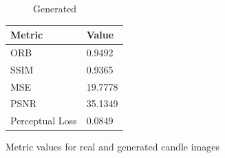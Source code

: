 \documentclass[12pt,DIV14,BCOR12mm,a4paper,footinclude=false,headinclude,parskip=half-,twoside,openright,cleardoublepage=empty,toc=index,bibliography=totoc,listof=totoc]{scrreprt}
\numberwithin{equation}{chapter}
\begin{document}
\begin{figure}
\begin{minipage}[H]{\linewidth}
\begin{minipage}[H]{0.5\linewidth}
\begin{subfigure}[t]{0.48\linewidth}
                \caption{Generated}
            \end{subfigure}
        \end{minipage}%
        \hfill
        \begin{minipage}[H]{0.5\linewidth} %
            \centering
            \small
            \begin{tabular}{p{3cm} p{2cm}}
                \toprule
                \textbf{Metric} & \textbf{Value} \\
                \midrule
                ORB             & 0.9492        \\
                SSIM            & 0.9365        \\
                MSE             & 19.7778       \\
                PSNR            & 35.1349       \\
                Perceptual Loss & 0.0849        \\
                \bottomrule
            \end{tabular}
        \end{minipage}%
        \caption{Metric values for real and generated candle images}
        \label{fig:comparison_real_generated_1_1_candle}
    \end{minipage}
\end{figure}
\end{document}
